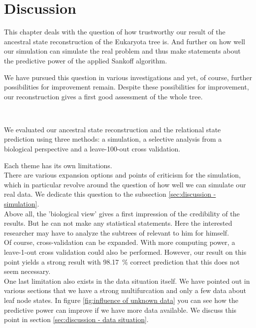 \chapter{Discussion}
  This chapter deals with the question of how trustworthy our result of the ancestral state 
    reconstruction of the Eukaryota tree is. And further on how well our simulation can simulate the 
    real problem and thus make statements about the predictive power of the applied Sankoff algorithm.

  We have pursued this question in various investigations and yet, of course, further possibilities 
    for improvement remain. Despite these possibilities for improvement, our reconstruction gives a 
    first good assessment of the whole tree.

   \\
  
  We evaluated our ancestral state reconstruction and the relational state prediction using three 
    methods: a simulation, a selective analysis from a biological perspective and a leave-100-out 
    cross validation.
  
  Each theme has its own limitations. \\
  There are various expansion options and points of criticism for the simulation, which in 
    particular revolve around the question of how well we can simulate our real data. We dedicate 
    this question to the subsection \ref{sec:discussion - simulation}. \\
  Above all, the 'biological view' gives a first impression of the credibility of the results. But 
    he can not make any statistical statements. Here the interested researcher may have to analyze 
    the subtrees of relevant to him for himself. \\
   Of course, cross-validation can be expanded. With more computing power, a leave-1-out cross 
    validation could also be performed. However, our result on this point yields a strong result 
    with 98.17~\% correct prediction that this does not seem necessary. \\
  One last limitation also exists in the data situation itself. We have pointed out in various 
    sections that we have a strong multifurcation and only a few data about leaf node states. In 
    figure \ref{fig:influence of unknown data} you can see how the predictive power can improve if 
    we have more data available. We discuss this point in section 
    \ref{sec:discussion - data situation}.

